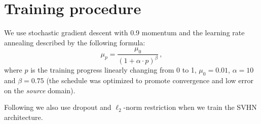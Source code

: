 \section{Training procedure}
\label{sect:appendix_training}

We use stochastic gradient descent with 0.9 momentum and the learning rate annealing described by the following formula:
\begin{equation*}
  \mu_p = \frac{\mu_0}{(1 + \alpha \cdot p)^\beta} \, , 
\end{equation*}
where $ p $ is the training progress linearly changing from 0 to 1, $ \mu_0 = 0.01 $, $ \alpha = 10 $ and $ \beta = 0.75 $ (the schedule was optimized to promote convergence and low error on the \emph{source} domain).

Following \cite{Srivastava14} we also use dropout and $ \ell_2 $-norm restriction when we train the SVHN architecture.



